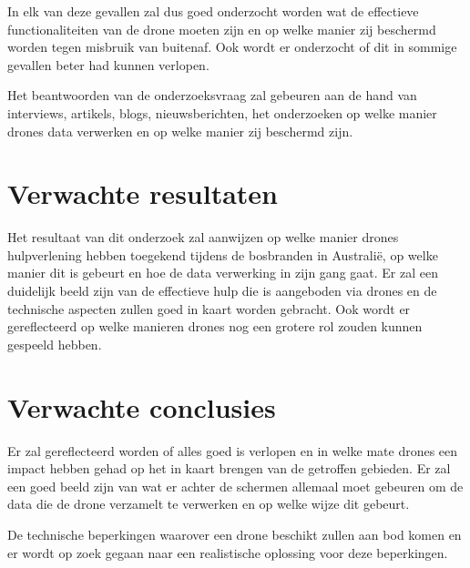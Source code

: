 In elk van deze gevallen zal dus goed onderzocht worden wat de effectieve functionaliteiten van de drone moeten zijn en op welke manier zij beschermd worden tegen misbruik van buitenaf. Ook wordt er onderzocht of dit in sommige gevallen beter had kunnen verlopen.

Het beantwoorden van de onderzoeksvraag zal gebeuren aan de hand van interviews, artikels, blogs, nieuwsberichten, het onderzoeken op welke manier drones data verwerken en op welke manier zij beschermd zijn.

\section{Verwachte resultaten}
\label{sec:verwachte_resultaten}

Het resultaat van dit onderzoek zal aanwijzen op welke manier drones hulpverlening hebben toegekend tijdens de bosbranden in Australië, op welke manier dit is gebeurt en hoe de data verwerking in zijn gang gaat. Er zal een duidelijk beeld zijn van de effectieve hulp die is aangeboden via drones en de technische aspecten zullen goed in kaart worden gebracht. Ook wordt er gereflecteerd op welke manieren drones nog een grotere rol zouden kunnen gespeeld hebben.


\section{Verwachte conclusies}
\label{sec:verwachte_conclusies}

Er zal gereflecteerd worden of alles goed is verlopen en in welke mate drones een impact hebben gehad op het in kaart brengen van de getroffen gebieden. Er zal een goed beeld zijn van wat er achter de schermen allemaal moet gebeuren om de data die de drone verzamelt te verwerken en op welke wijze dit gebeurt.

De technische beperkingen waarover een drone beschikt zullen aan bod komen en er wordt op zoek gegaan naar een realistische oplossing voor deze beperkingen.

